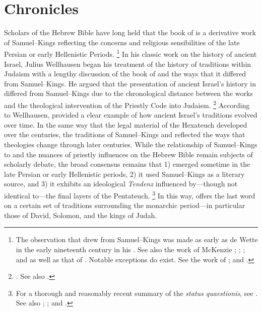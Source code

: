
\chapter{Chronicles}
\label{chap:chronicles}

Scholars of the Hebrew Bible have long held that the book of \chronicles is a derivative work of Samuel--Kings reflecting the concerns and religious sensibilities of the late Persian or early Hellenistic Periods.%
    \footnote{The observation that \chronicles drew from Samuel--Kings was made as early as de Wette in the early nineteenth century in his \cite*{dewette1806}. See also the work of McKenzie
        \cite*{mckenzie1985};
        \cite{mckenzie_graham-mckenzie1999};
        \cite[66--71]{knoppers2003}; and
        \cite[30--42]{klein2006} as well as that of
        \cite[74--74]{carr2011}. Notable exceptions do exist. See the work of
        \cite{auld1994};
        \cite{auld_graham-mckenzie1999} and
        \cite{person2010}.}
In his classic work on the history of ancient Israel, Julius Wellhausen began his treatment of the history of traditions within Judaism with a lengthy discussion of the book of \chronicles and the ways that it differed from Samuel--Kings. He argued that the presentation of ancient Israel's history in \chronicles differed from Samuel--Kings due to the chronological distance between the works and the theological intervention of the Priestly Code into \secondtemple Judaism.%
    \footnote{%
        \cite[171--172]{wellhausen1957}. See also
        \cite{wright_ulrich-wright1992}.}
According to Wellhausen, \chronicles provided a clear example of how ancient Israel's traditions evolved over time. In the same way that the legal material of the Hexateuch developed over the centuries, the traditions of Samuel--Kings and \chronicles reflected the ways that  theologies change through later centuries. While the relationship of Samuel--Kings to \chronicles and the nuances of priestly influences on the Hebrew Bible remain subjects of scholarly debate, the broad consensus remains that 1) \chronicles emerged sometime in the late Persian or early Hellenistic periods, 2) it used Samuel--Kings as a literary source, and 3) it exhibits an ideological \emph{Tendenz} influenced by---though not identical to---the final layers of the Pentateuch.%
    \footnote{For a thorough and reasonably recent summary of the \emph{status quaestionis}, see
        \cite[72--89]{knoppers2003}. See also
        \cite{japhet1993};
        \cite{japhet2009};
        \cite{braun1986} and
        \cite{coggins1976}.}
In this way, \chronicles offers the last word on a certain set of traditions surrounding the monarchic period---in particular those of David, Solomon, and the kings of Judah.

